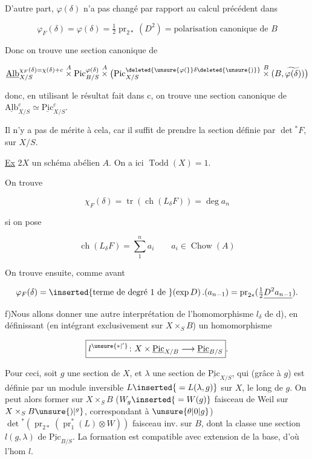 D'autre part, $\varphi(\delta)$ n'a pas changé  par rapport au calcul précédent dans 

\[
\boxed{\varphi_F(\delta)=\varphi(\delta)=\tfrac12\operatorname{pr}_{2*}(D^2)=\text{polarisation canonique de }B}
\]

Donc on trouve une section canonique de

\[
\underline{\mathrm{Alb}}_{X/S}^{\chi_F(\delta)=\chi(\delta)+c}\overset{A}{\times}\mathrm{Pic}_{B/S}^{\varphi(\delta)}\overset{A}{\times}\bigl(\mathrm{Pic}_{X/S}^{\deleted{\unsure{\varphi(}}\delta\deleted{\unsure{)}}}\overset{B}{\times}(B,\widetilde{\varphi(\delta)})\bigr)
\]

donc, en utilisant le résultat fait dans c, on trouve une section canonique de $\underline{\mathrm{Alb}}^{c}_{X/S}\simeq\underline{\mathrm{Pic}}^{c}_{X/S}$.

Il n'y a pas de mérite à cela, car il suffit de prendre la section définie par  $\det{}^*F$, sur $X/S$.

\uline{Ex} 2\qquad $X$ un schéma abélien $A$. On a ici $\operatorname{Todd}(X)=1$.

On trouve

\[
\chi_F(\delta)=\operatorname{tr}(\operatorname{ch}(L_\delta F))=\deg a_n
\]

si on pose

\[
\operatorname{ch}(L_\delta F)=\sum_1^n a_i\qquad a_i\in\operatorname{Chow}(A)
\]

On trouve ensuite, comme avant

\[
\varphi_F(\delta)=\inserted{\text{terme de degré 1 de }}(\exp D)\,.(a_{n-1})=\operatorname{pr}_{2*}(\tfrac12\underline{D^2a_{n-1}}).
\]

f)\qquad Nous allons donner une autre interprétation de l'homomorphisme $l_\delta$ de d), en définissant (en intégrant exclusivement sur $X\times_S B$) un homomorphisme

\[
\boxed{l^{\unsure{*|' }}\colon X\times\underline{\mathrm{Pic}}_{X/B}\longrightarrow\underline{\mathrm{Pic}}_{B/S}}.
\]


Pour ceci, soit $g$ une section de $X$, et $\lambda$ une section de $\underline{\mathrm{Pic}}_{X/S}$, qui (grâce à $g$) est définie par un module inversible $L\inserted{{}=L(\lambda,g)}$ sur  $X$,  le long de $g$. On peut alors former sur $X\times_S B$ ($W_g\inserted{{}=W(g)}$ faisceau de Weil sur $X\times_S B\unsure{)|^{g}}$, correspondant à $\unsure{\theta|0|g}$) $\det{}^{*}(\operatorname{pr}_{2*}(\operatorname{pr}_1^{*}(L)\otimes W))$  faisceau inv. sur $B$, dont la classe  une section $l(g,\lambda)$ de $\underline{\mathrm{Pic}}_{B/S}$. La formation est compatible avec extension de la base, d'où l'hom $l$.

